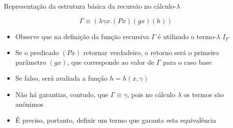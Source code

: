 \begin{frame}[fragile]{Representação da estrutura básica da recursão no cálculo-$\lambda$}

    \begin{huge}
    \[
        \Gamma\equiv (\lambda \gamma x.(Px)(gx)(h))
    \]
    \end{huge}

    \begin{itemize}
        \item Observe que na definição da função recursiva $\Gamma$ é utilizado o 
            termo-$\lambda$ $I_F$

        \item Se o predicado $(Px)$ retornar verdadeiro, o retorno será o primeiro parâmetro 
            $(gx)$, que corresponde ao valor de $\Gamma$ para o caso base

        \item Se falso, será avaliada a função $h = h(x, \gamma)$

        \item Não há garantias, contudo, que $\Gamma\equiv \gamma$, pois no cálculo $\lambda$ 
            os termos são anônimos

        \item É preciso, portanto, definir um termo que garanta esta equivalência
    \end{itemize}
\end{frame}
